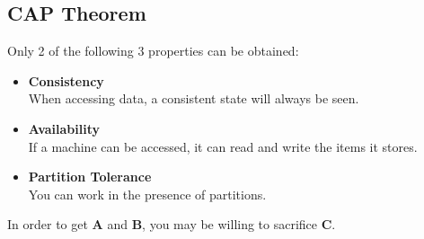 \documentclass{article}
\begin{document}
\subsection{CAP Theorem}
Only 2 of the following 3 properties can be obtained:

\begin{itemize}
	\item \textbf{Consistency}
	\vspace{.2cm} \\
	When accessing data, a consistent state will always be seen.
	
	\item \textbf{Availability}
	\vspace{.2cm} \\
	If a machine can be accessed, it can read and write the items it stores.
	
	\item \textbf{Partition Tolerance}
	\vspace{.2cm} \\
	You can work in the presence of partitions.
\end{itemize}
In order to get \textbf{A} and \textbf{B}, you may be willing to sacrifice \textbf{C}.
\end{document}
